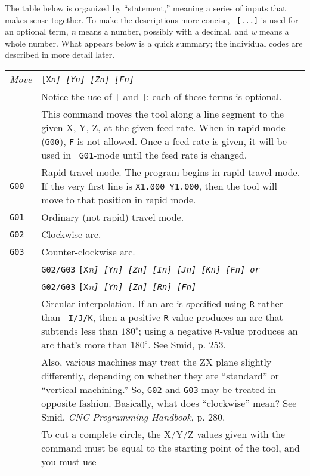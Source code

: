 \documentclass[titlepage,oneside,10pt]{article}
\begin{document}
The table below is organized by ``statement,'' meaning a series of
inputs that makes sense together. To make the descriptions more concise, {\tt
  [...]} is used for an optional term, \emph{n} means a number,
possibly with a decimal, and \emph{w} means a whole number. What
appears below is a quick summary; the individual codes are described
in more detail later.

\vskip 0.25cm
\begin{longtable}{lp{10cm}}
\em{Move} & \tt{[X}\em{n}\tt{]} \tt{[Y}\em{n}\tt{]}
\tt{[Z}\em{n}\tt{]} \tt{[F}\em{n}\tt{]} \\ 
& Notice the use of {\tt [} and {\tt ]}: each of these terms is
optional. \\
& This command moves the tool along a line segment to the given X, Y,
Z, at the given feed rate. When in rapid mode ({\tt G00}), {\tt F} is
not allowed. Once a feed rate is given, it will be used in {\tt
  G01}-mode until the feed rate is changed.\\
{\tt G00}&Rapid travel mode. The program begins in rapid travel
mode. If the very first line is {\tt X1.000 Y1.000}, then the tool
will move to that position in rapid mode.\\
{\tt G01}&Ordinary (not rapid) travel mode.\\
{\tt G02}& Clockwise arc.\\
{\tt G03}&Counter-clockwise arc. \\
& {\tt G02/G03} {\tt [X}\em{n}\tt{]} \tt{[Y}\em{n}\tt{]}
\tt{[Z}\em{n}\tt{]} {\tt [I}\em{n}\tt{]} \tt{[J}\em{n}\tt{]}
\tt{[K}\em{n}\tt{]} \tt{[F}\em{n}{\tt ]} \emph{or} \\
&{\tt G02/G03} {\tt [X}\em{n}\tt{]} \tt{[Y}\em{n}\tt{]} \tt{[Z}\em{n}\tt{]}
\tt{[R}\em{n}\tt{]} \tt{[F}\em{n}\tt{]}\\
&Circular interpolation. If an arc is specified using {\tt R} rather than {\tt
  I/J/K}, then a positive {\tt R}-value produces an arc that subtends
less than $180^\circ$; using a negative {\tt R}-value produces an arc
that's more than $180^\circ$. See Smid, p. 253. \\
&Also, various machines may treat the ZX plane slightly
differently, depending on whether they are ``standard'' or ``vertical
machining.'' So, {\tt G02} and {\tt G03} may be treated in opposite
fashion. Basically, what does ``clockwise'' mean? See Smid, \emph{CNC
  Programming Handbook}, p. 280.\\
&To cut a complete circle, the X/Y/Z values given with the command
must be equal to the starting point of the tool, and you must use

\end{longtable}
\end{document}
